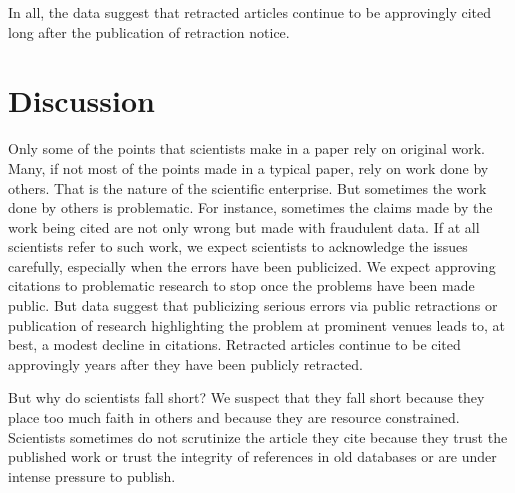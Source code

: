\documentclass[12pt, letterpaper]{article}
\begin{document}
In all, the data suggest that retracted articles continue to be approvingly cited long after the publication of retraction notice. 

\section*{Discussion}
Only some of the points that scientists make in a paper rely on original work. Many, if not most of the points made in a typical paper, rely on work done by others. That is the nature of the scientific enterprise. But sometimes the work done by others is problematic. For instance, sometimes the claims made by the work being cited are not only wrong but made with fraudulent data. If at all scientists refer to such work, we expect scientists to acknowledge the issues carefully, especially when the errors have been publicized. We expect approving citations to problematic research to stop once the problems have been made public. But data suggest that publicizing serious errors via public retractions or publication of research highlighting the problem at prominent venues leads to, at best, a modest decline in citations. Retracted articles continue to be cited approvingly years after they have been publicly retracted.

But why do scientists fall short? We suspect that they fall short because they place too much faith in others and because they are resource constrained. Scientists sometimes do not scrutinize the article they cite because they trust the published work or trust the integrity of references in old databases or are under intense pressure to publish.
\end{document}
